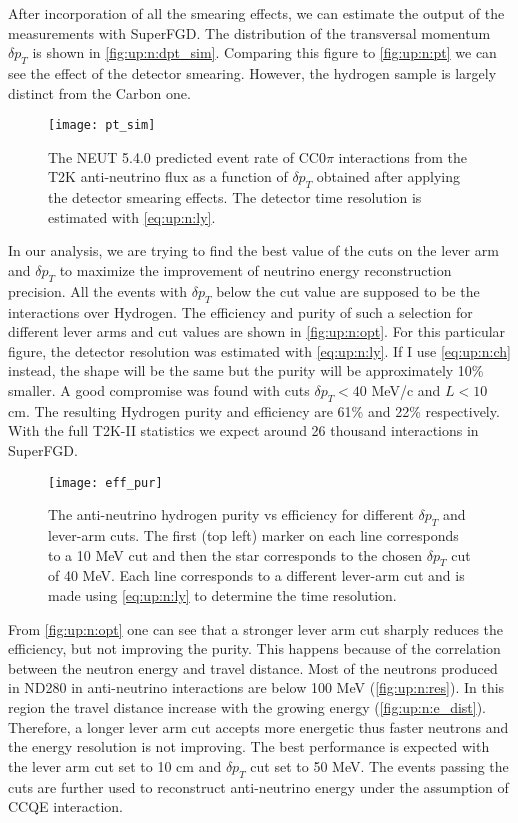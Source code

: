 \documentclass[main.tex]{subfiles}
\begin{document}
After incorporation of all the smearing effects, we can estimate the output of the measurements with SuperFGD. The distribution of the transversal momentum $\delta p_T$ is shown in \autoref{fig:up:n:dpt_sim}. Comparing this figure to \autoref{fig:up:n:pt} we can see the effect of the detector smearing. However, the hydrogen sample is largely distinct from the Carbon one.

\begin{figure}[!ht]
  \centering
  \texttt{[image: pt\_sim]}
  \caption{The NEUT 5.4.0 predicted event rate of CC0$\pi$ interactions from the T2K anti-neutrino flux as a function of $\delta p_T$ obtained after applying the detector smearing effects. The detector time resolution is estimated with \autoref{eq:up:n:ly}.}
  \label{fig:up:n:dpt_sim}
\end{figure}

In our analysis, we are trying to find the best value of the cuts on the lever arm and $\delta p_T$ to maximize the improvement of neutrino energy reconstruction precision. All the events with $\delta p_T$ below the cut value are supposed to be the interactions over Hydrogen. The efficiency and purity of such a selection for different lever arms and cut values are shown in \autoref{fig:up:n:opt}. For this particular figure, the detector resolution was estimated with \autoref{eq:up:n:ly}. If I use \autoref{eq:up:n:ch} instead, the shape will be the same but the purity will be approximately 10\% smaller. A good compromise was found with cuts $\delta p_T < 40$ MeV/c and $L < 10$ cm. The resulting Hydrogen purity and efficiency are 61\% and 22\% respectively. With the full T2K-II statistics we expect around 26 thousand interactions in SuperFGD.

\begin{figure}[!ht]
  \centering
  \texttt{[image: eff\_pur]}
  \caption{The anti-neutrino hydrogen purity vs efficiency for different $\delta p_T$ and lever-arm cuts. The first (top left) marker on each line corresponds to a 10 MeV cut and then the star corresponds to the chosen $\delta p_T$ cut of 40 MeV. Each line corresponds to a different lever-arm cut and is made using \autoref{eq:up:n:ly} to determine the time resolution.}
  \label{fig:up:n:opt}
\end{figure}

From \autoref{fig:up:n:opt} one can see that a stronger lever arm cut sharply reduces the efficiency, but not improving the purity. This happens because of the correlation between the neutron energy and travel distance. Most of the neutrons produced in ND280 in anti-neutrino interactions are below 100 MeV (\autoref{fig:up:n:res}). In this region the travel distance increase with the growing energy (\autoref{fig:up:n:e_dist}). Therefore, a longer lever arm cut accepts more energetic thus faster neutrons and the energy resolution is not improving. The best performance is expected with the lever arm cut set to 10 cm and $\delta p_T$ cut set to 50 MeV. The events passing the cuts are further used to reconstruct anti-neutrino energy under the assumption of CCQE interaction.
\end{document}
